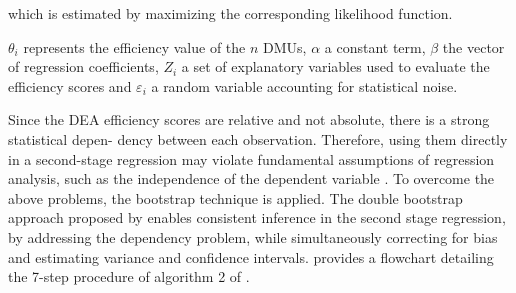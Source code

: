 which is estimated by maximizing the corresponding likelihood function.

$\theta_i$ represents the efficiency value of the $n$ DMUs, $\alpha$ a constant term, $\beta$ the vector of
regression coefficients, $Z_i$ a set of explanatory variables used to evaluate the efficiency scores and $\varepsilon_i$ a
random variable accounting for statistical noise. 

Since the DEA efficiency scores are relative and not absolute, there is a strong statistical depen-
dency between each observation. Therefore, using them directly in a second-stage regression may
violate fundamental assumptions of regression analysis, such as the independence of the dependent
variable \cite{simar2007}. 
To overcome the above problems, the bootstrap technique is applied. 
The double bootstrap approach proposed
by \cite{simar2007} enables consistent inference in the second stage regression, by addressing
the dependency problem, while simultaneously correcting for bias and estimating variance and confidence intervals.   provides a flowchart detailing the 7-step procedure of algorithm 2 of \cite{simar2007}.

